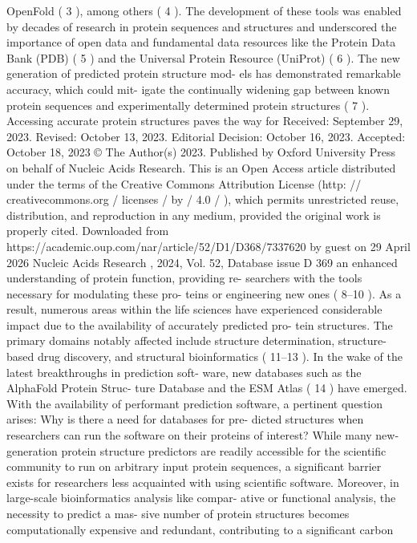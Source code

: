OpenFold ( 3 ), among others ( 4 ). The development of these
tools was enabled by decades of research in protein sequences
and structures and underscored the importance of open data
and fundamental data resources like the Protein Data Bank
(PDB) ( 5 ) and the Universal Protein Resource (UniProt) ( 6 ).
The new generation of predicted protein structure mod-
els has demonstrated remarkable accuracy, which could mit-
igate the continually widening gap between known protein
sequences and experimentally determined protein structures
( 7 ). Accessing accurate protein structures paves the way for
Received: September 29, 2023. Revised: October 13, 2023. Editorial Decision: October 16, 2023. Accepted: October 18, 2023
© The Author(s) 2023. Published by Oxford University Press on behalf of Nucleic Acids Research.
This is an Open Access article distributed under the terms of the Creative Commons Attribution License (http: // creativecommons.org / licenses / by / 4.0 / ),
which permits unrestricted reuse, distribution, and reproduction in any medium, provided the original work is properly cited.
Downloaded from https://academic.oup.com/nar/article/52/D1/D368/7337620 by guest on 29 April 2026
Nucleic Acids Research , 2024, Vol. 52, Database issue
D 369
an enhanced understanding of protein function, providing re-
searchers with the tools necessary for modulating these pro-
teins or engineering new ones ( 8–10 ). As a result, numerous
areas within the life sciences have experienced considerable
impact due to the availability of accurately predicted pro-
tein structures. The primary domains notably affected include
structure determination, structure-based drug discovery, and
structural bioinformatics ( 11–13 ).
In the wake of the latest breakthroughs in prediction soft-
ware, new databases such as the AlphaFold Protein Struc-
ture Database and the ESM Atlas ( 14 ) have emerged. With
the availability of performant prediction software, a pertinent
question arises: Why is there a need for databases for pre-
dicted structures when researchers can run the software on
their proteins of interest?
While many new-generation protein structure predictors
are readily accessible for the scientific community to run on
arbitrary input protein sequences, a significant barrier exists
for researchers less acquainted with using scientific software.
Moreover, in large-scale bioinformatics analysis like compar-
ative or functional analysis, the necessity to predict a mas-
sive number of protein structures becomes computationally
expensive and redundant, contributing to a significant carbon
